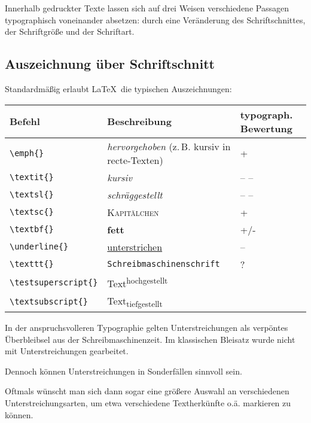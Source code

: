 
Innerhalb gedruckter Texte lassen sich auf drei Weisen verschiedene Passagen typographisch voneinander
absetzen:
durch eine Veränderung des Schriftschnittes,
der Schriftgröße und
der Schriftart.

\subsection{Auszeichnung über Schriftschnitt}

Standardmäßig erlaubt \LaTeX\ die typischen Auszeichnungen:

\begin{center}
\begin{tabular}{lll}
      Befehl &		Beschreibung & typograph. Bewertung \\
      \hline
 \lstinline/\emph{}/ 		&	\emph{hervorgehoben} (z.\,B. kursiv in recte-Texten) 		&	+ \\
 \lstinline/\textit{}/		&		\textsl{kursiv} &	-- -- \\
 \lstinline/\textsl{}/		&		\textsl{schräggestellt} &	-- -- \\
 \lstinline/\textsc{}/		&		\textsc{Kapitälchen}	&	+ \\
 \lstinline/\textbf{}/ 		&		\textbf{fett} 		&	+/- \\
 \lstinline/\underline{}/ 	&		\underline{unterstrichen} &	-- \\
 \lstinline/\texttt{}/		&		\texttt{Schreibmaschinenschrift} &	? \\
 \lstinline/\testsuperscript{}/ &	Text\textsuperscript{hochgestellt} &	\\
 \lstinline/\textsubscript{}/ &		Text\textsubscript{tiefgestellt} & \\
 \end{tabular} 
\end{center}


In der anspruchsvolleren Typographie gelten Unterstreichungen als verpöntes Überbleibsel
aus der Schreibmaschinenzeit. Im klassischen Bleisatz wurde nicht mit Unterstreichungen
gearbeitet.

Dennoch können Unterstreichungen in Sonderfällen sinnvoll sein.

Oftmals wünscht man sich dann sogar eine größere Auswahl an verschiedenen 
Unterstreichungsarten, um etwa verschiedene Textherkünfte o.ä. markieren zu können.

